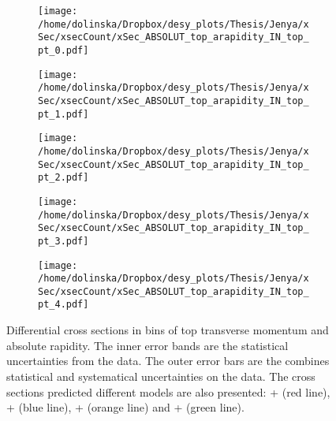 \begin{sidewaysfigure}[p]
\centering
\begin{subfigure}
  \centering
  \texttt{[image: /home/dolinska/Dropbox/desy\_plots/Thesis/Jenya/xSec/xsecCount/xSec\_ABSOLUT\_top\_arapidity\_IN\_top\_pt\_0.pdf]}
\end{subfigure}
\begin{subfigure}
  \centering
  \texttt{[image: /home/dolinska/Dropbox/desy\_plots/Thesis/Jenya/xSec/xsecCount/xSec\_ABSOLUT\_top\_arapidity\_IN\_top\_pt\_1.pdf]}
\end{subfigure}
\begin{subfigure}
  \centering
  \texttt{[image: /home/dolinska/Dropbox/desy\_plots/Thesis/Jenya/xSec/xsecCount/xSec\_ABSOLUT\_top\_arapidity\_IN\_top\_pt\_2.pdf]}
\end{subfigure}
\begin{subfigure}
  \centering
  \texttt{[image: /home/dolinska/Dropbox/desy\_plots/Thesis/Jenya/xSec/xsecCount/xSec\_ABSOLUT\_top\_arapidity\_IN\_top\_pt\_3.pdf]}
\end{subfigure}
\begin{subfigure}
  \centering
  \texttt{[image: /home/dolinska/Dropbox/desy\_plots/Thesis/Jenya/xSec/xsecCount/xSec\_ABSOLUT\_top\_arapidity\_IN\_top\_pt\_4.pdf]}
\end{subfigure}
\caption{Differential cross sections in bins of top transverse momentum and absolute rapidity. The inner error bands are the statistical uncertainties from the data.
         The outer error bars are the combines statistical and systematical uncertainties on the data. The cross sections predicted different models are also presented:
         \MG + \PYTHIA (red line), \Powheg + \PYTHIA (blue line), \Powheg + \HERWIG (orange line) and \MCNLO + \HERWIG (green line).}
\label{fig:XSU_2D_y_pt1}
\end{sidewaysfigure}

